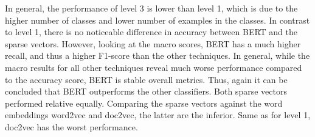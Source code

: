 \documentclass[12pt, a4paper, titlepage]{article}
\begin{document}
\begin{table}[hb!]
\caption{\label{tab: T10} Evaluation of level 3 classification - macro}
\end{table}

In general, the performance of level 3 is lower than level 1, which is due to the higher number of classes and lower number of examples in the classes. In contrast to level 1, there is no noticeable difference in accuracy between \ac{BERT} and the sparse vectors. However, looking at the macro scores, \ac{BERT} has a much higher recall, and thus a higher F1-score than the other techniques. In general, while the macro results for all other techniques reveal much worse performance compared to the accuracy score, \ac{BERT} is stable overall metrics. Thus, again it can be concluded that \ac{BERT} outperforms the other classifiers. Both sparse vectors performed relative equally. Comparing the sparse vectors against the word embeddings word2vec and doc2vec, the latter are the inferior. Same as for level 1, doc2vec has the worst performance.
\end{document}
